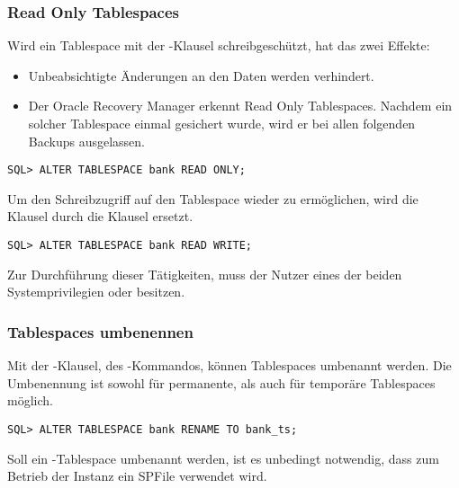         \subsubsection{Read Only Tablespaces}
          Wird ein Tablespace mit der -Klausel
          schreibgesch\"utzt, hat das zwei Effekte:
          \begin{itemize}
            \item Unbeabsichtigte \"Anderungen an den Daten werden verhindert.
            \item Der Oracle Recovery Manager erkennt Read Only Tablespaces. Nachdem ein solcher Tablespace einmal gesichert wurde, wird er bei allen folgenden Backups ausgelassen.
          \end{itemize}
          \begin{lstlisting}[caption={Einen Tablespace Read Only setzen},label=admin114,language=oracle_sql]
SQL> ALTER TABLESPACE bank READ ONLY;
          \end{lstlisting}
          Um den Schreibzugriff auf den Tablespace wieder zu erm\"oglichen, wird die Klausel  durch die Klausel  ersetzt.
          \begin{lstlisting}[caption={Einen Tablespace Read Write setzen},label=admin115,language=oracle_sql]
SQL> ALTER TABLESPACE bank READ WRITE;
          \end{lstlisting}
          Zur Durchf\"uhrung dieser T\"atigkeiten, muss der Nutzer eines der beiden Systemprivilegien  oder  besitzen.
        \subsubsection{Tablespaces umbenennen}
          Mit der -Klausel, des -Kommandos, k\"onnen Tablespaces umbenannt werden. Die Umbenennung ist sowohl f\"ur permanente, als auch f\"ur tempor\"are Tablespaces m\"oglich.
          \begin{lstlisting}[caption={Einen Tablespace umbenennen},label=admin116,language=oracle_sql]
SQL> ALTER TABLESPACE bank RENAME TO bank_ts;
          \end{lstlisting}
          \begin{merke}
            Soll ein -Tablespace umbenannt werden, ist es unbedingt notwendig, dass zum Betrieb der Instanz ein SPFile verwendet wird.
          \end{merke}
